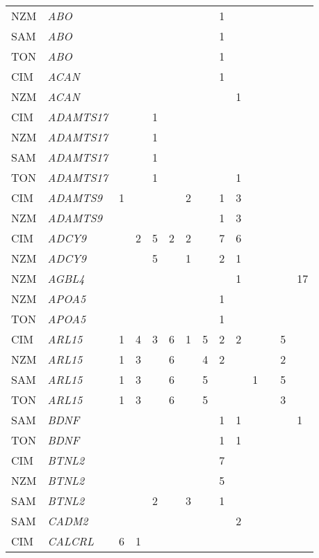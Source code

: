 \documentclass[]{report}
\begin{document}
\begin{ThreePartTable}
\begin{longtable}[t]{llllllllllllll}
NZM & \em{ABO} &  &  &  &  &  &  & 1 &  &  &  &  & \\
SAM & \em{ABO} &  &  &  &  &  &  & 1 &  &  &  &  & \\
TON & \em{ABO} &  &  &  &  &  &  & 1 &  &  &  &  & \\
CIM & \em{ACAN} &  &  &  &  &  &  & 1 &  &  &  &  & \\
NZM & \em{ACAN} &  &  &  &  &  &  &  & 1 &  &  &  & \\
CIM & \em{ADAMTS17} &  &  & 1 &  &  &  &  &  &  &  &  & \\
NZM & \em{ADAMTS17} &  &  & 1 &  &  &  &  &  &  &  &  & \\
SAM & \em{ADAMTS17} &  &  & 1 &  &  &  &  &  &  &  &  & \\
TON & \em{ADAMTS17} &  &  & 1 &  &  &  &  & 1 &  &  &  & \\
CIM & \em{ADAMTS9} & 1 &  &  &  & 2 &  & 1 & 3 &  &  &  & \\
NZM & \em{ADAMTS9} &  &  &  &  &  &  & 1 & 3 &  &  &  & \\
CIM & \em{ADCY9} &  & 2 & 5 & 2 & 2 &  & 7 & 6 &  &  &  & \\
NZM & \em{ADCY9} &  &  & 5 &  & 1 &  & 2 & 1 &  &  &  & \\
NZM & \em{AGBL4} &  &  &  &  &  &  &  & 1 &  &  &  & 17\\
NZM & \em{APOA5} &  &  &  &  &  &  & 1 &  &  &  &  & \\
TON & \em{APOA5} &  &  &  &  &  &  & 1 &  &  &  &  & \\
CIM & \em{ARL15} & 1 & 4 & 3 & 6 & 1 & 5 & 2 & 2 &  &  & 5 & \\
NZM & \em{ARL15} & 1 & 3 &  & 6 &  & 4 & 2 &  &  &  & 2 & \\
SAM & \em{ARL15} & 1 & 3 &  & 6 &  & 5 &  &  & 1 &  & 5 & \\
TON & \em{ARL15} & 1 & 3 &  & 6 &  & 5 &  &  &  &  & 3 & \\
SAM & \em{BDNF} &  &  &  &  &  &  & 1 & 1 &  &  &  & 1\\
TON & \em{BDNF} &  &  &  &  &  &  & 1 & 1 &  &  &  & \\
CIM & \em{BTNL2} &  &  &  &  &  &  & 7 &  &  &  &  & \\
NZM & \em{BTNL2} &  &  &  &  &  &  & 5 &  &  &  &  & \\
SAM & \em{BTNL2} &  &  & 2 &  & 3 &  & 1 &  &  &  &  & \\
SAM & \em{CADM2} &  &  &  &  &  &  &  & 2 &  &  &  & \\
CIM & \em{CALCRL} & 6 & 1 &  &  &  &  &  &  &  &  &  & \\

\end{longtable}
\end{ThreePartTable}
\end{document}
